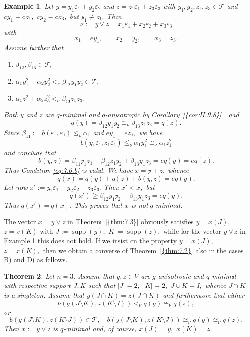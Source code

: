 \documentclass [12pt,a4paper,reqno]{amsart}
\newtheorem{thm}{Theorem} [section]
\newtheorem{examp}[thm]{Example}
\begin{document}
\begin{examp}\label{examp:7.4}
Let $y=y_1{\varepsilon}_1+y_2{\varepsilon}_2$ and
$z=z_1{\varepsilon}_1 +z_3{\varepsilon}_3$ with
$y_1,y_2,z_1,z_3\in{\mathcal T}$ and $ey_1=ez_1,$ $ey_2=ez_3,$ but
$y_1\ne z_1.$ Then
$$x:=y\vee z=x_1{\varepsilon}_1+x_2{\varepsilon}_2+x_3{\varepsilon}_3$$
with
$$x_1=ey_1,\qquad x_2=y_2,\qquad x_3=z_3.$$
Assume further that \begin{enumerate} {\setlength{\itemsep}{2pt}}

\item[1)]
${\beta}_{12},{\beta}_{13}\in{\mathcal T},$

\item[2)]
${\alpha}_1y_1^2+{\alpha}_2y_2^2<_\nu{\beta}_{12}y_1y_2\in{\mathcal T},$

\item[3)] ${\alpha}_1z_1^2+{\alpha}_3z_3^2<_\nu{\beta}_{13}z_1 z_3.$
\end{enumerate}
Both $y$ and $z$ are $q$-minimal and $g$-anisotropic by
{Corollary~\ref{{cor:II.9.8}}}
, and
$$q(y)={\beta}_{12}y_1y_2\cong_\nu{\beta}_{13}z_1z_3=q(z).$$
Since ${\beta}_{11}:=b({\varepsilon}_1,{\varepsilon}_1)\le_\nu{\alpha}_1$
and $ey_1=ez_1,$ we have
$$b(y_1{\varepsilon}_1,z_1{\varepsilon}_1)\le_\nu
{\alpha}_1y_1^2\cong_\nu{\alpha}_1z_1^2$$ and conclude that
$$b(y,z)={\beta}_{11}y_1z_1+{\beta}_{12}z_1y_2+{\beta}_{13}y_1z_3=eq(y)=eq(z).$$
Thus Condition \eqref{eq:7.6.b} is valid. We have $x=y+z,$ whence
$$q(x)=q(y)+q(z)+b(y,z)=eq(y).$$
Let now $x':=y_1{\varepsilon}_1+y_2{\varepsilon}_2+z_3{\varepsilon}_3.$
Then $x'<x,$ but
$$q(x')\ge {\beta}_{12}y_1y_2+{\beta}_{13}y_1z_3=eq(y).$$
Thus $q(x')=q(x).$ This proves that $x$ is \textit{not}
$q$-minimal.
\end{examp}

The vector $x=y\vee z$ in {Theorem~\ref{{thm:7.3}}} obviously satisfies
$y=x(J), $ $z=x(K)$ with $J:={\operatorname{supp}} (y),$ $K:={\operatorname{supp}} (z),$ while for the
vector $y\vee z$ in Example \ref{examp:7.4} this does not hold. If
we insist on the property $y=x(J),$ $z=x(K),$ then we obtain a
converse of {Theorem~\ref{{thm:7.2}}} also in the cases B) and D) as
follows.

\begin{thm}\label{thm:7.5}
Let $n=3.$ Assume that $y,z\in V$ are $g$-anisotropic and
$q$-minimal with respective support $J,K$ such that $|J| = 2,$ $|K|=2,$ $J\cup
K=I,$ whence $J\cap K$ is a singleton. Assume that $y(J\cap
K)=z(J\cap K)$ and furthermore  that either
\begin{equation}\label{eq:7.10}
b(y(J\setminus K),z(K\setminus J))<_\nu q(y)\cong_\nu q(z);
\end{equation}
or
\begin{equation}\label{eq:7.11}
b(y(J\setminus K),z(K\setminus J))\in {\mathcal T},\quad
b(y(J\setminus K),z(K\setminus J))\cong_\nu q(y)\cong_\nu q(z).
\end{equation}
Then $x:=y\vee z$ is $q$-minimal and, of course, $x(J)=y,$
$x(K)=z.$
\end{thm}
\end{document}
